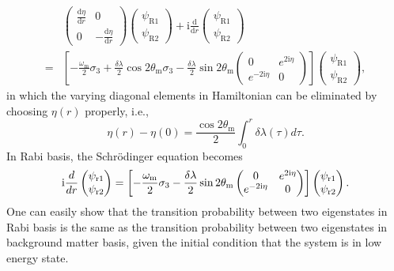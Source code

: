 \begin{align*}
    &\begin{pmatrix}  \frac{\mathrm d\eta}{\mathrm dr}  & 0 \\ 0 & - \frac{\mathrm d\eta}{\mathrm d r}  \end{pmatrix} \begin{pmatrix} \psi_{\mathrm R1} \\ \psi_{\mathrm R2} \end{pmatrix} + \mathrm i \frac{\mathrm d}{\mathrm dr} \begin{pmatrix} \psi_{\mathrm R1} \\ \psi_{\mathrm R2} \end{pmatrix} \\
    =& \left[ -\frac{\omega_{\mathrm m} }{2} \sigma_3  + \frac{\delta \lambda}{2} \cos 2\theta_{\mathrm m}  \sigma_3  - \frac{\delta \lambda}{2} \sin 2\theta_{\mathrm m} \begin{pmatrix} 0 & e^{2\mathrm i\eta} \\ e^{-2 \mathrm i\eta } & 0 \end{pmatrix}   \right] \begin{pmatrix} \psi_{\mathrm R1} \\ \psi_{\mathrm R2} \end{pmatrix},
\end{align*}
in which the varying diagonal elements in Hamiltonian can be eliminated by choosing $\eta(r)$ properly, i.e.,
\begin{equation}
    \eta(r) - \eta(0) =  \frac{\cos 2\theta_{\mathrm{m}}}{2} \int_0^r \delta\lambda (\tau) d\tau.
\end{equation}
In Rabi basis, the Schr\"{o}dinger equation becomes
\begin{equation*}
    \mathrm{i} \frac{d}{dr} \begin{pmatrix} \psi_{\mathrm r1} \\ \psi_{\mathrm r2} \end{pmatrix} = \left[ - \frac{\omega_{\mathrm m}}{2} \sigma_3 - \frac{\delta \lambda}{2} \sin 2\theta_{\mathrm m} \begin{pmatrix} 0 & e^{2\mathrm{i}\eta} \\ e^{-2 \mathrm{i} \eta } & 0 \end{pmatrix}\right] \begin{pmatrix} \psi_{\mathrm r1} \\ \psi_{\mathrm r2} \end{pmatrix}.
\end{equation*}
One can easily show that the transition probability between two eigenstates in Rabi basis is the same as the transition probability between two eigenstates in background matter basis, given the initial condition that the system is in low energy state.

